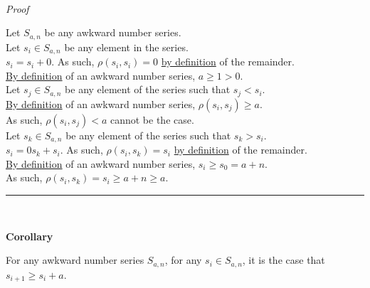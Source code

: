 \documentclass[a4paper,12pt]{article}
\begin{document}
\noindent \\
\textit{Proof}

\noindent Let $S_{a, n}$ be any awkward number series.\\

\noindent Let $s_i \in S_{a, n}$ be any element in the series.\\

\noindent $s_i = s_i + 0$. As such, $\rho(s_i, s_i) = 0$ \hyperlink{theorem:remainder_theorem}{by definition} of the remainder.\\

\noindent \hyperlink{definition:awkward_number_series}{By definition} of an awkward number series, $a \geq 1 > 0$.\\

\noindent Let $s_j \in S_{a, n}$ be any element of the series such that $s_j < s_i$.\\

\noindent \hyperlink{definition:awkward_number_series}{By definition} of an awkward number series, $\rho(s_i, s_j) \geq a$.\\

\noindent As such, $\rho(s_i, s_j) < a$ cannot be the case.\\

\noindent Let $s_k \in S_{a, n}$ be any element of the series such that $s_k > s_i$.\\

\noindent $s_i = 0s_k + s_i$. As such, $\rho(s_i, s_k) = s_i$ \hyperlink{theorem:remainder_theorem}{by definition} of the remainder.\\

\noindent \hyperlink{definition:awkward_number_series}{By definition} of an awkward number series, $s_i \geq s_0 = a + n$.\\

\noindent As such, $\rho(s_i, s_k) = s_i \geq a + n \geq a$.

\begin{center}
\noindent\rule{8cm}{0.4pt}
\end{center}
\noindent \\






\label{lemma:non_divisibility_of_elements}
\hypertarget{lemma:non_divisibility_of_elements}{}
\begin{tcolorbox}
\textbf{Corollary}

For any awkward number series $S_{a, n}$, for any $s_i \in S_{a, n}$, it is the case that $s_{i + 1} \geq s_i + a$.
\end{tcolorbox}
\end{document}
